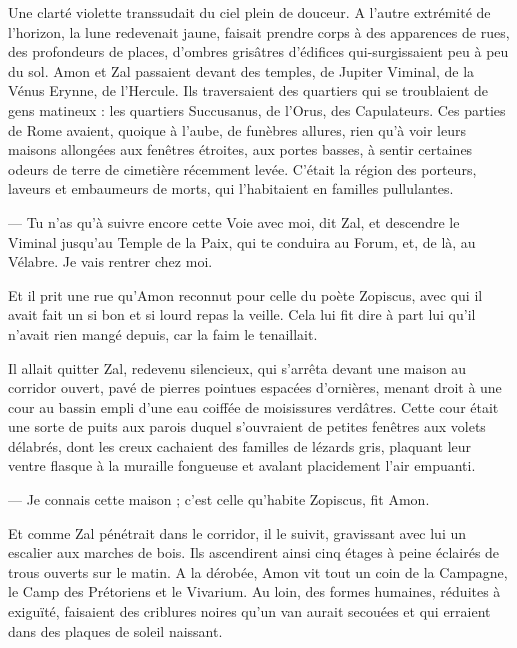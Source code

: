 \documentclass[a4paper, 11pt, oneside, polutonikogreek, french]{article}
\begin{document}
Une clarté violette transsudait du ciel plein de douceur. A l'autre extrémité de l'horizon, la lune redevenait jaune, faisait prendre corps à des apparences de rues, des profondeurs de places, d'ombres grisâtres d'édifices qui-surgissaient peu à peu du sol. Amon et Zal passaient devant des temples, de Jupiter Viminal, de la Vénus Erynne, de l'Hercule. Ils traversaient des quartiers qui se troublaient de gens matineux : les quartiers Succusanus, de l'Orus, des Capulateurs. Ces parties de Rome avaient, quoique à l'aube, de funèbres allures, rien qu'à voir leurs maisons allongées aux fenêtres étroites, aux portes basses, à sentir certaines odeurs de terre de cimetière récemment levée. C'était la région des porteurs, laveurs et embaumeurs de morts, qui l'habitaient en familles pullulantes.

--- Tu n'as qu'à suivre encore cette Voie avec moi, dit Zal, et descendre le Viminal jusqu'au Temple de la Paix, qui te conduira au Forum, et, de là, au Vélabre. Je vais rentrer chez moi.

Et il prit une rue qu'Amon reconnut pour celle du poète Zopiscus, avec qui il avait fait un si bon et si lourd repas la veille. Cela lui fit dire à part lui qu'il n'avait rien mangé depuis, car la faim le tenaillait.

Il allait quitter Zal, redevenu silencieux, qui s'arrêta devant une maison au corridor ouvert, pavé de pierres pointues espacées d'ornières, menant droit à une cour au bassin empli d'une eau coiffée de moisissures verdâtres. Cette cour était une sorte de puits aux parois duquel s'ouvraient de petites fenêtres aux volets délabrés, dont les creux cachaient des familles de lézards gris, plaquant leur ventre flasque à la muraille fongueuse et avalant placidement l'air empuanti.

--- Je connais cette maison ; c'est celle qu'habite Zopiscus, fit Amon.

Et comme Zal pénétrait dans le corridor, il le suivit, gravissant avec lui un escalier aux marches de bois. Ils ascendirent ainsi cinq étages à peine éclairés de trous ouverts sur le matin. A la dérobée, Amon vit tout un coin de la Campagne, le Camp des Prétoriens et le Vivarium. Au loin, des formes humaines, réduites à exiguïté, faisaient des criblures noires qu'un van aurait secouées et qui erraient dans des plaques de soleil naissant.
\end{document}
